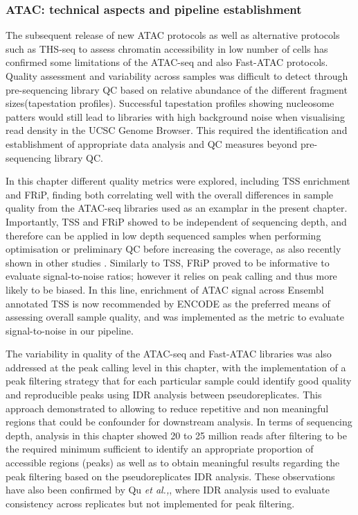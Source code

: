 \subsubsection{ATAC: technical aspects and pipeline establishment}

The subsequent release of new ATAC protocols as well as alternative protocols such as THS-seq to assess chromatin accessibility in low number of cells has confirmed some limitations of the ATAC-seq and also Fast-ATAC protocols. Quality assessment and variability across samples was difficult to detect through pre-sequencing library QC based on relative abundance of the different fragment sizes(tapestation profiles). Successful tapestation profiles showing nucleosome patters would still lead to libraries with high background noise when visualising read density in the UCSC Genome Browser. This required the identification and establishment of appropriate data analysis and QC measures beyond pre-sequencing library QC.

In this chapter different quality metrics were explored, including TSS enrichment and FRiP, finding both correlating well with the overall differences in sample quality from the ATAC-seq libraries used as an examplar in the present chapter. Importantly, TSS and FRiP showed to be independent of sequencing depth, and therefore can be applied in low depth sequenced samples when performing optimisation or preliminary QC before increasing the coverage, as also recently shown in other studies \parencite{Corces2017}. Similarly to TSS, FRiP proved to be informative to evaluate signal-to-noise ratios; however it relies on peak calling and thus more likely to be biased. In this line, enrichment of ATAC signal across Ensembl annotated TSS is now recommended by ENCODE as the preferred means of assessing overall sample quality, and was implemented as the metric to evaluate signal-to-noise in our pipeline. 

The variability in quality of the ATAC-seq and Fast-ATAC libraries was also addressed at the peak calling level in this chapter, with the implementation of a peak filtering strategy that for each particular sample could identify good quality and reproducible peaks using IDR analysis between pseudoreplicates. This approach demonstrated to allowing to reduce  repetitive and non meaningful regions that could be confounder for downstream analysis. In terms of sequencing depth, analysis in this chapter showed 20 to 25 million reads after filtering to be the required minimum sufficient to identify an appropriate proportion of accessible regions (peaks) as well as to obtain meaningful results regarding the peak filtering based on the pseudoreplicates IDR analysis. These observations have also been confirmed by Qu \textit{et al.,}, where IDR analysis used to evaluate consistency across replicates but not implemented for peak filtering.

